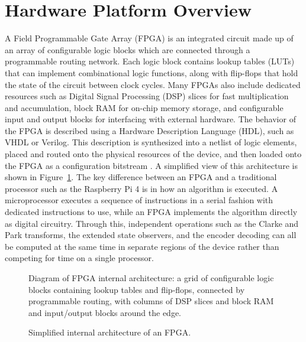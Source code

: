 \section{Hardware Platform Overview}\label{FPGAOverview}

A Field Programmable Gate Array (FPGA) is an integrated circuit made up of an array of configurable logic blocks which are connected through a programmable routing network. Each logic block contains lookup tables (LUTs) that can implement combinational logic functions, along with flip-flops that hold the state of the circuit between clock cycles. Many FPGAs also include dedicated resources such as Digital Signal Processing (DSP) slices for fast multiplication and accumulation, block RAM for on-chip memory storage, and configurable input and output blocks for interfacing with external hardware. The behavior of the FPGA is described using a Hardware Description Language (HDL), such as VHDL or Verilog. This description is synthesized into a netlist of logic elements, placed and routed onto the physical resources of the device, and then loaded onto the FPGA as a configuration bitstream \cite{binfet_implementation_2026}. A simplified view of this architecture is shown in Figure~\ref{fig:fpga_architecture}. The key difference between an FPGA and a traditional processor such as the Raspberry Pi 4 is in how an algorithm is executed. A microprocessor executes a sequence of instructions in a serial fashion with dedicated instructions to use, while an FPGA implements the algorithm directly as digital circuitry. Through this, independent operations such as the Clarke and Park transforms, the extended state observers, and the encoder decoding can all be computed at the same time in separate regions of the device rather than competing for time on a single processor.

\begin{figure}[htbp]
	\centering
		{Diagram of FPGA internal architecture: a grid of configurable logic blocks containing lookup tables and flip-flops, connected by programmable routing, with columns of DSP slices and block RAM and input/output blocks around the edge.}
	\caption[FPGA architecture]{Simplified internal architecture of an FPGA.}
	\label{fig:fpga_architecture}
\end{figure}

